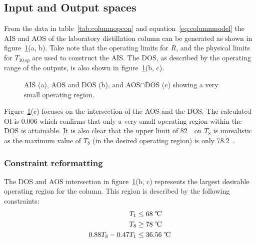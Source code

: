 \documentclass[final,authoryear,5pt,times,twocolumn]{elsarticle}
\begin{document}
\subsection{Input and Output spaces}
From the data in table~\ref{tab:columnopcon} and equation~\ref{eq:columnmodel} the AIS and AOS of the laboratory distillation column can be generated as shown in figure~\ref{fig:columnaisaos}(a, b).
Take note that the operating limits for $R$, and the physical limits for $T_{10~sp}$ are used to construct the AIS.
The DOS, as described by the operating range of the outputs, is also shown in figure~\ref{fig:columnaisaos}(b, c).

\begin{figure}[htbp]
  \centering
    \scalebox{1}{}
    \scalebox{1}{}
    \scalebox{1}{}
  \caption{AIS (a), AOS and DOS (b), and AOS$\cap$DOS (c) showing a very small operating region.}
  \label{fig:columnaisaos}
\end{figure}

Figure~\ref{fig:columnaisaos}(c) focuses on the intersection of the AOS and the DOS.
The calculated OI is 0.006 which confirms that only a very small operating region within the DOS is attainable.
It is also clear that the upper limit of 82~\textcelsius\ on $T_8$ is unrealistic as the maximum value of $T_8$ (in the desired operating region) is only 78.2~\textcelsius.

\subsubsection{Constraint reformatting}
The DOS and AOS intersection in figure~\ref{fig:columnaisaos}(b, c) represents the largest desirable operating region for the column.
This region is described by the following constraints:
\begin{align*}
  T_1 &\leq 68\text{~\textcelsius} \\
  T_8 &\geq 78\text{~\textcelsius} \\
  0.88T_8-0.47T_1&\leq 36.56\text{~\textcelsius}
\end{align*}
\end{document}
